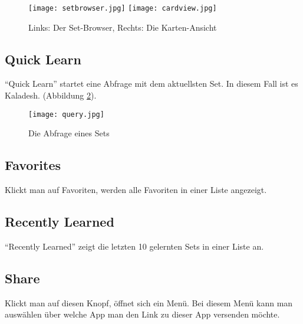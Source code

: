 \begin{figure}[htbp] 
  \centering
     \texttt{[image: setbrowser.jpg]}
      \texttt{[image: cardview.jpg]}
  \caption{Links: Der Set-Browser, Rechts: Die Karten-Ansicht}
  \label{fig:setbrowser}
\end{figure}

\subsection{Quick Learn}
"`Quick Learn"' startet eine Abfrage mit dem aktuellsten Set. In diesem Fall ist es Kaladesh. (Abbildung \ref{fig:queryview}).

\begin{figure}[htbp] 
  \centering
     \texttt{[image: query.jpg]}
  \caption{Die Abfrage eines Sets}
  \label{fig:queryview}
\end{figure}

\subsection{Favorites}
Klickt man auf Favoriten, werden alle Favoriten in einer Liste angezeigt.

\subsection{Recently Learned}
"`Recently Learned"' zeigt die letzten 10 gelernten Sets in einer Liste an.

\subsection{Share}
Klickt man auf diesen Knopf, öffnet sich ein Menü. Bei diesem Menü kann man auswählen über welche App man den Link zu dieser App versenden möchte.